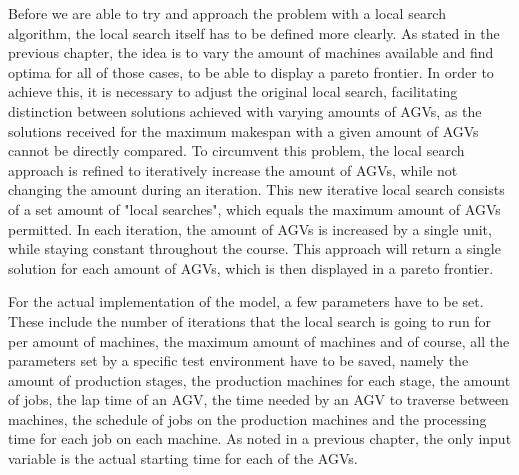 Before we are able to try and approach the problem with a local search algorithm, the local search itself has to be defined more clearly. As stated
in the previous chapter, the idea is to vary the amount of machines available and find optima for all of those cases, to be able to display a pareto
frontier. In order to achieve this, it is necessary to adjust the original local search, facilitating distinction between solutions achieved with
varying amounts of AGVs, as the solutions received for the maximum makespan with a given amount of AGVs cannot be directly
compared. To circumvent this problem, the local search approach is refined to iteratively increase the amount of AGVs, while not changing the amount
during an iteration. This new iterative local search consists of a set amount of "local searches", which equals the maximum amount of AGVs permitted.
In each iteration, the amount of AGVs is increased by a single unit, while staying constant throughout the course. This approach will return a single solution for
each amount of AGVs, which is then displayed in a pareto frontier.

For the actual implementation of the model, a few parameters have to be set. These include the number of iterations that the local search is going
to run for per amount of machines, the maximum amount of machines and of course, all the parameters set by a specific test environment have to be
saved, namely the amount of production stages, the production machines for each stage, the amount of jobs, the lap time of an AGV, the time needed 
by an AGV to traverse between machines, the schedule of jobs on the production machines and the processing time for each job on each machine.
As noted in a previous chapter, the only input variable is the actual starting time for each of the AGVs.

